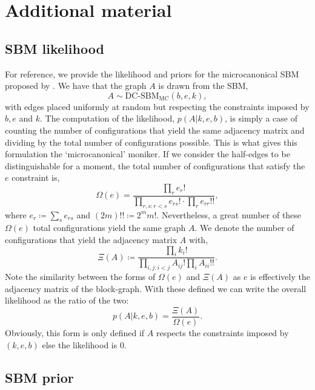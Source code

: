 \section{Additional material}

\subsection{SBM likelihood}
\label{appdx:sbm-likelihood}

For reference, we provide the likelihood and priors for the microcanonical SBM proposed by \citet{Peixoto-Bayesian-Microcanonical}. We have that the graph $A$ is drawn from the SBM,
%
\begin{equation}
	A \sim \textrm{DC-SBM}_{\textrm{MC}}(b, e, k),
\end{equation}
%
with edges placed uniformly at random but respecting the constraints imposed by $b, e$ and $k$. The computation of the likelihood, $p(A|k, e, b)$, is simply a case of counting the number of configurations that yield the same adjacency matrix and dividing by the total number of configurations possible. This is what gives this formulation the `microcanonical' moniker. If we consider the half-edges to be distinguishable for a moment, the total number of configurations that satisfy the $e$ constraint is,
%
\begin{equation}
	\Omega(e) = \frac{\prod_{r} e_r !}{\prod_{r,s : r < s} e_{rs}! \cdot \prod_{r} e_{rr}!!},
\end{equation}
%
where $e_r \coloneqq \sum_{s} e_{rs}$ and $(2m)!! \coloneqq 2^m m!$. Nevertheless, a great number of these $\Omega(e)$ total configurations yield the same graph $A$. We denote the number of configurations that yield the adjacency matrix $A$ with,
%
\begin{equation}
	\Xi(A) \coloneqq \frac{\prod_i k_i !}{\prod_{i,j : i < j} A_{ij} ! \prod_i A_{ii} !! }.
\end{equation}
%
Note the similarity between the forms of $\Omega(e)$ and $\Xi(A)$ as $e$ is effectively the adjacency matrix of the block-graph. With these defined we can write the overall likelihood as the ratio of the two:
%
\begin{equation}
	p(A|k,e,b) = \frac{\Xi(A)}{\Omega(e)}.
\end{equation}
%
Obviously, this form is only defined if $A$ respects the constraints imposed by $(k,e,b)$ else the likelihood is 0.

\subsection{SBM prior}
\label{appdx:sbm-prior}

